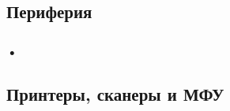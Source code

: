 \subsection{Периферия}\label{base:introduction:components:peripheral}
\subsubsection{•}

\subsection{Принтеры, сканеры и МФУ}\label{base:introduction:components:printers}

